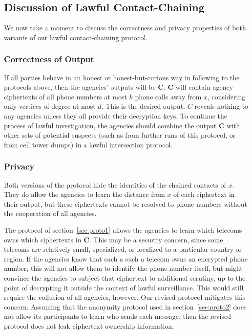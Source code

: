 \subsection{Discussion of Lawful Contact-Chaining}

\label{sec:discuss}



We now take a moment to discuss the correctness and privacy properties of both variants of our lawful contact-chaining protocol.



\subsubsection{Correctness of Output}



If all parties behave in an honest or honest-but-curious way in following to the protocols above, then the agencies' outputs will be $\mathbf{C}$. $\mathbf{C}$ will contain agency ciphertexts of all phone numbers at most $k$ phone calls away from $x$, considering only vertices of degree at most $d$. This is the desired output. $C$ reveals nothing to any agencies unless they all provide their decryption keys. To continue the process of lawful investigation, the agencies should combine the output $\mathbf{C}$ with other sets of potential suspects (such as from further runs of this protocol, or from cell tower dumps) in a lawful intersection protocol.



\subsubsection{Privacy}



Both versions of the protocol hide the identities of the chained contacts of $x$. They do allow the agencies to learn the distance from $x$ of each ciphertext in their output, but these ciphertexts cannot be resolved to phone numbers without the cooperation of all agencies.



The protocol of section~\ref{sec:proto1} allows the agencies to learn which telecoms owns which ciphertexts in $\mathbf{C}$. This may be a security concern, since some telecoms are relatively small, specialized, or localized to a particular country or region. If the agencies know that such a such a telecom owns an encrypted phone number, this will not allow them to identify the phone number itself, but might convince the agencies to subject that ciphertext to additional scrutiny, up to the point of decrypting it outside the context of lawful surveillance. This would still require the collusion of all agencies, however. Our revised protocol mitigates this concern. Assuming that the anonymity protocol used in section~\ref{sec:proto2} does not allow its participants to learn who sends each message, then the revised protocol does not leak ciphertext ownership information.



